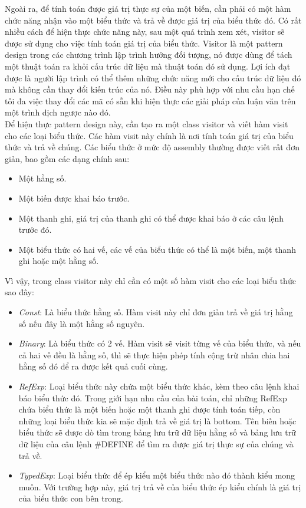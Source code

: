 Ngoài ra, để tính toán được giá trị thực sự của một biến, cần phải có một hàm chức năng nhận vào một biểu thức và trả về được giá trị của biểu thức đó. Có rất nhiều cách để hiện thực chức năng này, sau một quá trình xem xét, visitor sẽ được sử dụng cho việc tính toán giá trị của biểu thức. Visitor \cite{dessignpattern} là một pattern design trong các chương trình lập trình hướng đối tượng, nó được dùng để tách một thuật toán ra khỏi cấu trúc dữ liệu mà thuật toán đó sử dụng. Lợi ích đạt được là người lập trình có thể thêm những chức năng mới cho cấu trúc dữ liệu đó mà không cần thay đổi kiến trúc của nó. Điều này phù hợp với nhu cầu hạn chế tối đa việc thay đổi các mã có sẵn khi hiện thực các giải pháp của luận văn trên một trình dịch ngược nào đó.\\

Để hiện thực pattern design này, cần tạo ra một class visitor và viết hàm visit cho các loại biểu thức. Các hàm visit này chính là nơi tính toán giá trị của biểu thức và trả về chúng. Các biểu thức ở mức độ assembly thường được viết rất đơn giản, bao gồm các dạng chính sau:
\begin{itemize}
	\item Một hằng số.
	\item Một biến được khai báo trước.
	\item Một thanh ghi, giá trị của thanh ghi có thể được khai báo ở các câu lệnh trước đó.
	\item Một biểu thức có hai vế, các vế của biểu thức có thể là một biến, một thanh ghi hoặc một hằng số.
\end{itemize}
Vì vậy, trong class visitor này chỉ cần có một số hàm visit cho các loại biểu thức sao đây:

\begin{itemize}
	\item \textit{Const}: Là biểu thức hằng số. Hàm visit này chỉ đơn giản trả về giá trị hằng số nếu đây là một hằng số nguyên.
	\item \textit{Binary}: Là biểu thức có 2 vế. Hàm visit sẽ visit từng vế của biểu thức, và nếu cả hai vế đều là hằng số, thì sẽ thực hiện phép tính cộng trừ nhân chia hai hằng số đó để ra được kết quả cuối cùng.
	\item \textit{RefExp}: Loại biểu thức này chứa một biểu thức khác, kèm theo câu lệnh khai báo biểu thức đó. Trong giới hạn nhu cầu của bài toán, chỉ những RefExp chứa biểu thức là một biến hoặc một thanh ghi được tính toán tiếp, còn những loại biểu thức kia sẽ mặc định trả về giá trị là bottom. Tên biến hoặc biểu thức sẽ được dò tìm trong bảng lưu trữ dữ liệu hằng số và bảng lưu trữ dữ liệu của câu lệnh \#DEFINE để tìm ra được giá trị thực sự của chúng và trả về.
	\item \textit{TypedExp}: Loại biểu thức để ép kiểu một biểu thức nào đó thành kiểu mong muốn. Với trường hợp này, giá trị trả về của biểu thức ép kiểu chính là giá trị của biểu thức con bên trong.
\end{itemize}


